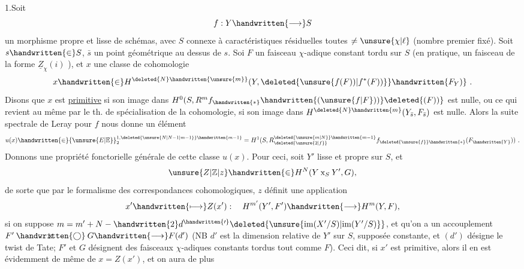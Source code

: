 
1.\quad Soit
\[
f:Y\handwritten{\longrightarrow}S
\]
un morphisme propre et lisse de schémas, avec $S$  connexe à caractéristiques résiduelles toutes $\ne\unsure{\chi|\ell}$ (nombre premier fixé). Soit $s\handwritten{\in}S$, $\bar s$ un point géométrique au dessus de $s$. Soi $F$ un faisceau $\chi$-adique constant tordu sur $S$ (en pratique, un faisceau de la forme $\underline{Z}_{\chi}(i)$ ), et $x$ une classe de cohomologie
\[
x\handwritten{\in}H^{\deleted{N}\handwritten{\unsure{m}}}(Y,\deleted{\unsure{f(F))|f^*(F))}}\handwritten{F_Y)}\ .
\]
Disons que $x$ est \uline{primitive} si son image dans $H^0(S,R^m f_{\handwritten{*}}\handwritten{(\unsure{f|F}))}\deleted{(F))}$ est nulle, ou ce qui revient au même par le th. de spécialisation de la cohomologie, si son image dans $H^{\deleted{N}\handwritten{m}}(Y_{\bar s},F_{\bar s})$ est nulle. Alors la suite spectrale de Leray pour $f$ nous donne un élément
\[
u(x)\handwritten{\in}{\unsure{E|\mathbb{E}}}_2^{1,\deleted{\unsure{N|N-1|m-1}}\handwritten{m-1}}=H^1(S,R^{\deleted{\unsure{m|N}}\handwritten{m-1}}_{\deleted{\unsure{2|f}}}f_{\deleted{\unsure{f}}\handwritten{*}}(F_{\handwritten{Y}}))\ .
\]
Donnons une propriété fonctorielle générale de cette classe $u(x)$. Pour ceci, soit $Y'$ lisse et propre sur $S$, et
\[
\unsure{Z|\mathbb{Z}|z}\handwritten{\in}H^N(Y\mathbin{\mathrm{x}}_S Y',G),
\]
de sorte que par le formalisme des correspondances cohomologiques, $z$ définit une application
\[
x'\handwritten{\longmapsto}Z(x'): \quad H^{m'}(Y',F')\handwritten{\longrightarrow}H^m(Y,F),
\]
si on suppose $m=m'+N-\handwritten{2}d^{\handwritten{\prime}}\deleted{\unsure{\mathrm{im}(X'/S)|\mathrm{im}(Y'/S)}}$, et qu'on a un accouplement $F'\mathbin{\ooalign{\hfil$\mathrm{x}$\hfil\cr\hfil$\handwritten{\bigcirc}$\hfil\cr}}G\handwritten{\longrightarrow}F(d')$ (NB $d'$ est la dimension relative de $Y'$ sur $S$, supposée constante, et $(d')$ désigne le twist de Tate; $F'$ et $G$ désignent des faisceaux $\chi$-adiques constants tordus  tout comme $F$). Ceci dit, si $x'$ est primitive, alors il en est évidemment de même de $x=Z(x')$, et on aura de plus
